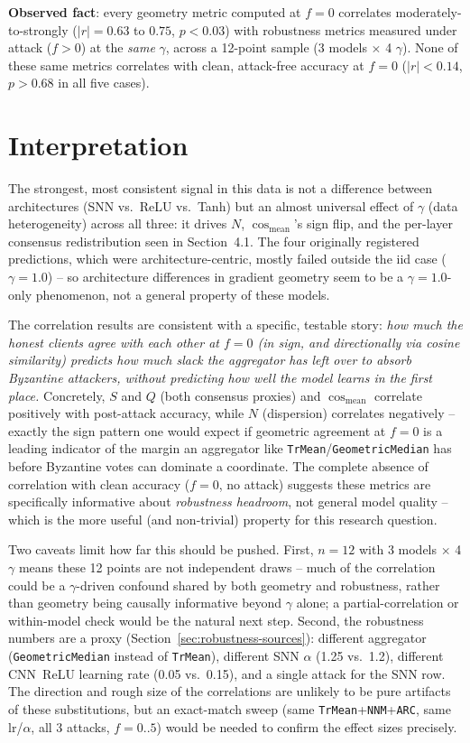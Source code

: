 \documentclass{article}
\begin{document}
\textbf{Observed fact}: every geometry metric computed at $f=0$ correlates moderately-to-strongly ($|r|=0.63$ to $0.75$, $p<0.03$) with robustness metrics measured under attack ($f>0$) at the \emph{same} $\gamma$, across a 12-point sample (3 models $\times$ 4 $\gamma$). None of these same metrics correlates with clean, attack-free accuracy at $f=0$ ($|r|<0.14$, $p>0.68$ in all five cases).

\section{Interpretation}

The strongest, most consistent signal in this data is not a difference between architectures (SNN vs.\ ReLU vs.\ Tanh) but an almost universal effect of $\gamma$ (data heterogeneity) across all three: it drives $N$, $\cos_{\text{mean}}$'s sign flip, and the per-layer consensus redistribution seen in Section~4.1. The four originally registered predictions, which were architecture-centric, mostly failed outside the iid case ($\gamma=1.0$) -- so architecture differences in gradient geometry seem to be a $\gamma=1.0$-only phenomenon, not a general property of these models.

The correlation results are consistent with a specific, testable story: \emph{how much the honest clients agree with each other at $f=0$ (in sign, and directionally via cosine similarity) predicts how much slack the aggregator has left over to absorb Byzantine attackers, without predicting how well the model learns in the first place.} Concretely, $S$ and $Q$ (both consensus proxies) and $\cos_{\text{mean}}$ correlate positively with post-attack accuracy, while $N$ (dispersion) correlates negatively -- exactly the sign pattern one would expect if geometric agreement at $f=0$ is a leading indicator of the margin an aggregator like \texttt{TrMean}/\texttt{GeometricMedian} has before Byzantine votes can dominate a coordinate. The complete absence of correlation with clean accuracy ($f=0$, no attack) suggests these metrics are specifically informative about \emph{robustness headroom}, not general model quality -- which is the more useful (and non-trivial) property for this research question.

Two caveats limit how far this should be pushed. First, $n=12$ with 3 models $\times$ 4 $\gamma$ means these 12 points are not independent draws -- much of the correlation could be a $\gamma$-driven confound shared by both geometry and robustness, rather than geometry being causally informative beyond $\gamma$ alone; a partial-correlation or within-model check would be the natural next step. Second, the robustness numbers are a proxy (Section~\ref{sec:robustness-sources}): different aggregator (\texttt{GeometricMedian} instead of \texttt{TrMean}), different SNN $\alpha$ (1.25 vs.\ 1.2), different CNN~ReLU learning rate (0.05 vs.\ 0.15), and a single attack for the SNN row. The direction and rough size of the correlations are unlikely to be pure artifacts of these substitutions, but an exact-match sweep (same \texttt{TrMean}+\texttt{NNM}+\texttt{ARC}, same lr/$\alpha$, all 3 attacks, $f=0..5$) would be needed to confirm the effect sizes precisely.
\end{document}

